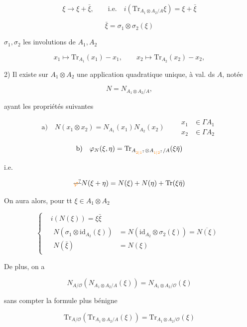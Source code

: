 \[
\xi\longrightarrow\xi+\bar\xi,\qquad\text{i.e.}\quad
\boxed{i(\mathrm{Tr}_{A_1\otimes A_2/A}\xi)=\xi+\bar\xi}
\]

\[
\bar\xi=\sigma_1\otimes\sigma_2(\xi)
\]

$\sigma_1,\sigma_2$ les involutions  de $A_1,A_2$

\[
x_1\longmapsto\mathrm{Tr}_{A_1}(x_1)-x_1,\qquad x_2\longmapsto\mathrm{Tr}_{A_2}(x_2)-x_2,
\]

2) Il existe sur $A_1\otimes A_2$ une application quadratique unique, à val. ds $A$, notée

\[
N=N_{A_1\otimes A_2/A},
\]



ayant les propriétés suivantes

\[
\text{a)}\quad N(x_1\otimes x_2)=N_{A_1}(x_1)N_{A_2}(x_2)
\qquad\begin{aligned}x_1&\in\Gamma A_1\\x_2&\in\Gamma A_2\end{aligned}
\]

\[
\text{b)}\quad\varphi_N(\xi,\eta)=\mathrm{Tr}_{A_{\unsure{2|1}}\otimes A_{\unsure{1|2}}/A}(\xi\bar\eta)
\]

 i.e.

\[
\deleted{\unsure{\varphi}}N(\xi+\eta)=N(\xi)+N(\eta)+\mathrm{Tr}(\xi\bar\eta)
\]

On aura alors, pour tt $\xi\in A_1\otimes A_2$

\[
\left\{\begin{aligned}
&\boxed{i(N(\xi))=\xi\bar\xi}\\
&\boxed{\begin{aligned}
N(\sigma_1\otimes\mathrm{id}_{A_2}(\xi))&=N(\mathrm{id}_{A_2}\otimes\sigma_2(\xi))=\overline{N(\xi)}\\
N(\bar\xi)&=N(\xi)
\end{aligned}}
\end{aligned}\right.
\]


De plus, on a

\[
\boxed{N_{A/\mathcal O}(N_{A_1\otimes A_2/A}(\xi))=N_{A_1\otimes A_2/\mathcal O}(\xi)}
\]

sans compter la formule plus bénigne

\[
\boxed{\mathrm{Tr}_{A/\mathcal O}(\mathrm{Tr}_{A_1\otimes A_2/A}(\xi))=\mathrm{Tr}_{A_1\otimes A_2/\mathcal O}(\xi)}
\]

